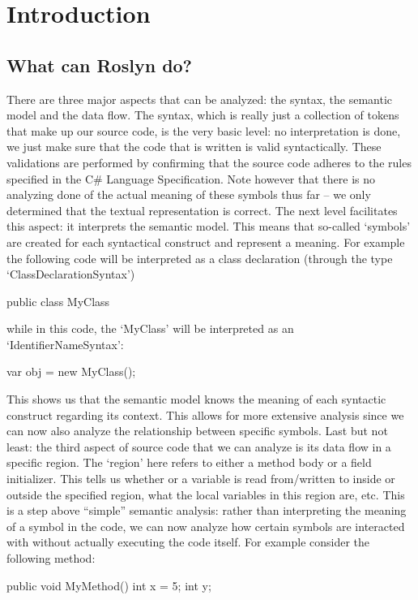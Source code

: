 \chapter{Introduction}
\label{ch:introduction}

\section{What can Roslyn do?}
\label{sec:intro-what}

There are three major aspects that can be analyzed: the syntax, the semantic model and the data flow. 
The syntax, which is really just a collection of tokens that make up our source code, is the very basic level: no interpretation is done, we just make sure that the code that is written is valid syntactically. These validations are performed by confirming that the source code adheres to the rules specified in the C# Language Specification. Note however that there is no analyzing done of the actual meaning of these symbols thus far – we only determined that the textual representation is correct.
The next level facilitates this aspect: it interprets the semantic model. This means that so-called ‘symbols’ are created for each syntactical construct and represent a meaning. For example the following code will be interpreted as a class declaration (through the type ‘ClassDeclarationSyntax’)

   public class MyClass { }
	
while in this code, the ‘MyClass’ will be interpreted as an ‘IdentifierNameSyntax’:

   var obj = new MyClass();
	
This shows us that the semantic model knows the meaning of each syntactic construct regarding its context. This allows for more extensive analysis since we can now also analyze the relationship between specific symbols. 
Last but not least: the third aspect of source code that we can analyze is its data flow in a specific region. The ‘region’ here refers to either a method body or a field initializer. This tells us whether or a variable is read from/written to inside or outside the specified region, what the local variables in this region are, etc. This is a step above “simple” semantic analysis: rather than interpreting the meaning of a symbol in the code, we can now analyze how certain symbols are interacted with without actually executing the code itself.
For example consider the following method:

   public void MyMethod()
   {
      int x = 5;
      int y;
   }
	

